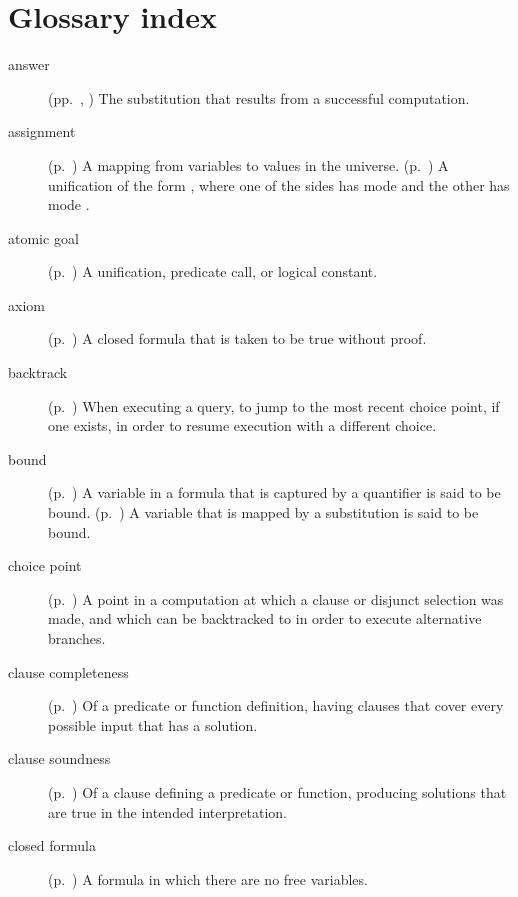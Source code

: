 \chapter{Glossary index}
\label{sec:glossary}

\begin{description}

\item[answer]
(pp.~\pageref{gi:answer}, \pageref{gi:answer2})
The substitution that results from a successful computation.

\item[assignment]
(p.~\pageref{sec:assignments})
A mapping from variables to values in the universe.
(p.~\pageref{gi:assignment})
A unification of the form ,
where one of the sides has mode 
and the other has mode .

\item[atomic goal]
(p.~\pageref{gi:atomic})
A unification, predicate call, or logical constant.

\item[axiom]
(p.~\pageref{gi:axiom})
A closed formula that is taken to be true without proof.

\item[backtrack]
(p.~\pageref{gi:backtrack})
When executing a query,
to jump to the most recent choice point,
if one exists,
in order to resume execution
with a different choice.

\item[bound]
(p.~\pageref{gi:bound})
A variable in a formula that is captured by a quantifier
is said to be bound.
(p.~\pageref{gi:bound2})
A variable that is mapped by a substitution is said to be bound.

\item[choice point]
(p.~\pageref{gi:choice-point})
A point in a computation at which a clause or disjunct selection was made,
and which can be backtracked to in order to execute alternative branches.

\item[clause completeness]
(p.~\pageref{gi:clause-completeness})
Of a predicate or function definition,
having clauses that cover every possible input that has a solution.

\item[clause soundness]
(p.~\pageref{gi:clause-soundness})
Of a clause defining a predicate or function,
producing solutions that are true in the intended interpretation.

\item[closed formula]
(p.~\pageref{gi:closed-formula})
A formula in which there are no free variables.


\end{description}

